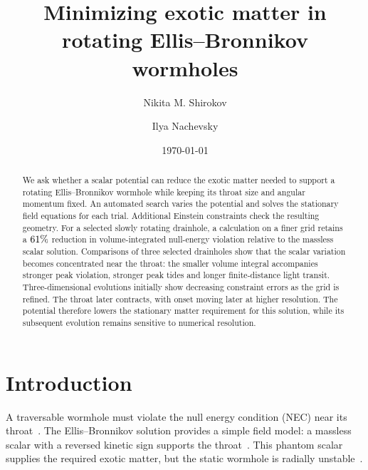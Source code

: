 \documentclass[twocolumn,floatfix,aps,prd,superscriptaddress,nofootinbib]{revtex4-2}
\begin{document}
\raggedbottom

\title{Minimizing exotic matter in rotating Ellis--Bronnikov wormholes}

\author{Nikita M. Shirokov}
\author{Ilya Nachevsky}
\date{\today}

\begin{abstract}
We ask whether a scalar potential can reduce the exotic matter needed to support a rotating Ellis--Bronnikov wormhole while keeping its throat size and angular momentum fixed. An automated search varies the potential and solves the stationary field equations for each trial. Additional Einstein constraints check the resulting geometry. For a selected slowly rotating drainhole, a calculation on a finer grid retains a $61\%$ reduction in volume-integrated null-energy violation relative to the massless scalar solution. Comparisons of three selected drainholes show that the scalar variation becomes concentrated near the throat: the smaller volume integral accompanies stronger peak violation, stronger peak tides and longer finite-distance light transit. Three-dimensional evolutions initially show decreasing constraint errors as the grid is refined. The throat later contracts, with onset moving later at higher resolution. The potential therefore lowers the stationary matter requirement for this solution, while its subsequent evolution remains sensitive to numerical resolution.
\end{abstract}

\maketitle

\section{Introduction}
\label{sec:intro}

A traversable wormhole must violate the null energy condition (NEC) near its throat~\cite{morris_thorne1988,visser1995}. The Ellis--Bronnikov solution provides a simple field model: a massless scalar with a reversed kinetic sign supports the throat~\cite{ellis1973,bronnikov1973}. This phantom scalar supplies the required exotic matter, but the static wormhole is radially unstable~\cite{gonzalez2009lin,gonzalez2009,shirokov2026,shirokov2026s}.
\end{document}
